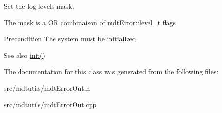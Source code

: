 Set the log levels mask. 

The mask is a OR combinaison of mdtError::level\_\-t flags \begin{DoxyPrecond}{Precondition}
The system must be initialized. 
\end{DoxyPrecond}
\begin{DoxySeeAlso}{See also}
\hyperlink{classmdt_error_out_a9c7f05b03d0f09ff02e8f747bdcd1de7}{init()} 
\end{DoxySeeAlso}


The documentation for this class was generated from the following files:\begin{DoxyCompactItemize}
\item 
src/mdtutils/mdtErrorOut.h\item 
src/mdtutils/mdtErrorOut.cpp\end{DoxyCompactItemize}
